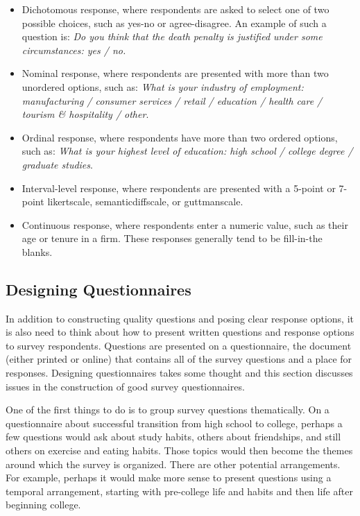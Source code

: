 \begin{itemize}
	\item Dichotomous response, where respondents are asked to select one of two possible choices, such as yes-no or agree-disagree. An example of such a question is: \textit{Do you think that the death penalty is justified under some circumstances: yes / no.}

	\item Nominal response, where respondents are presented with more than two unordered options, such as: \textit{What is your industry of employment: manufacturing / consumer services / retail / education / health care / tourism \& hospitality / other}.

	\item Ordinal response, where respondents have more than two ordered options, such as: \textit{What is your highest level of education: high school / college degree / graduate studies}.

	\item Interval-level response, where respondents are presented with a 5-point or 7-point \Gls{likertscale}, \gls{semanticdiffscale}, or \Gls{guttmanscale}. 

	\item Continuous response, where respondents enter a numeric value, such as their age or tenure in a firm. These responses generally tend to be fill-in-the blanks.
\end{itemize}

\subsection{Designing Questionnaires}

In addition to constructing quality questions and posing clear response options, it is also need to think about how to present written questions and response options to survey respondents. Questions are presented on a questionnaire, the document (either printed or online) that contains all of the survey questions and a place for responses. Designing questionnaires takes some thought and this section discusses issues in the construction of good survey questionnaires.

One of the first things to do is to group survey questions thematically. On a questionnaire about successful transition from high school to college, perhaps a few questions would ask about study habits, others about friendships, and still others on exercise and eating habits. Those topics would then become the themes around which the survey is organized. There are other potential arrangements. For example, perhaps it would make more sense to present questions using a temporal arrangement, starting with pre-college life and habits and then life after beginning college.

